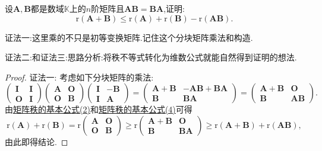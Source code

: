 \documentclass[../../main.tex]{subfiles}%
\begin{document}
\begin{proposition}\label{proposition:矩阵乘法可交换的秩不等式}
设\(\boldsymbol{A},\boldsymbol{B}\)都是数域\(\mathbb{K}\)上的\(n\)阶矩阵且\(\boldsymbol{A}\boldsymbol{B}=\boldsymbol{B}\boldsymbol{A}\),证明:
\[
\mathrm{r}(\boldsymbol{A}+\boldsymbol{B})\leqslant \mathrm{r}(\boldsymbol{A})+\mathrm{r}(\boldsymbol{B})-\mathrm{r}(\boldsymbol{A}\boldsymbol{B}).
\]
\end{proposition}
\begin{remark}
{\color{blue}证法一:}这里乘的不只是初等变换矩阵.记住这个分块矩阵乘法和构造.

{\color{blue}证法二:}和{\color{blue}证法三:}思路分析:将秩不等式转化为维数公式就能自然得到证明的想法.
\end{remark}
\begin{proof}

{\color{blue}证法一:}
考虑如下分块矩阵的乘法:
\[
\begin{pmatrix}
\boldsymbol{I}&\boldsymbol{I}\\
\boldsymbol{O}&\boldsymbol{I}
\end{pmatrix}
\begin{pmatrix}
\boldsymbol{A}&\boldsymbol{O}\\
\boldsymbol{O}&\boldsymbol{B}
\end{pmatrix}
\begin{pmatrix}
\boldsymbol{I}&-\boldsymbol{B}\\
\boldsymbol{I}&\boldsymbol{A}
\end{pmatrix}=
\begin{pmatrix}
\boldsymbol{A}+\boldsymbol{B}&-\boldsymbol{A}\boldsymbol{B}+\boldsymbol{B}\boldsymbol{A}\\
\boldsymbol{B}&\boldsymbol{B}\boldsymbol{A}
\end{pmatrix}=
\begin{pmatrix}
\boldsymbol{A}+\boldsymbol{B}&\boldsymbol{O}\\
\boldsymbol{B}&\boldsymbol{A}\boldsymbol{B}
\end{pmatrix}.
\]
由\hyperref[矩阵秩的基本公式2]{矩阵秩的基本公式(2)}和\hyperref[矩阵秩的基本公式4]{矩阵秩的基本公式(4)}可得
\[
\mathrm{r}(\boldsymbol{A})+\mathrm{r}(\boldsymbol{B})=\mathrm{r}\begin{pmatrix}
\boldsymbol{A}&\boldsymbol{O}\\
\boldsymbol{O}&\boldsymbol{B}
\end{pmatrix}\geqslant \mathrm{r}\begin{pmatrix}
\boldsymbol{A}+\boldsymbol{B}&\boldsymbol{O}\\
\boldsymbol{B}&\boldsymbol{B}\boldsymbol{A}
\end{pmatrix}\geqslant \mathrm{r}(\boldsymbol{A}+\boldsymbol{B})+\mathrm{r}(\boldsymbol{A}\boldsymbol{B}),
\]
由此即得结论.


\end{proof}
\end{document}

